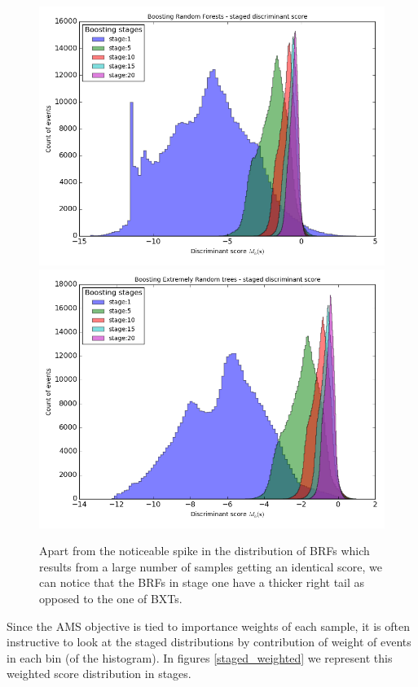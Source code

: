 \begin{figure}[h]
\includegraphics[width=\textwidth]{images/brf__staged.png}
\includegraphics[width=\textwidth]{images/bxt__staged.png}
\caption[Evolution of discriminant score in BRF and BXT.]{Apart from the noticeable spike in the distribution of BRFs which results from a large number of samples getting an identical score, we can notice that the BRFs in stage one have a thicker right tail as opposed to the one of BXTs.}
\label{staged}
\end{figure} 

Since the AMS objective is tied to importance weights of each sample, it is often instructive to look at the staged distributions by contribution of weight of events in each bin (of the histogram). In figures \ref{staged_weighted} we represent this weighted score distribution in stages.  

